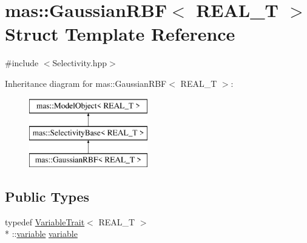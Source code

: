 \hypertarget{structmas_1_1_gaussian_r_b_f}{\section{mas\-:\-:Gaussian\-R\-B\-F$<$ R\-E\-A\-L\-\_\-\-T $>$ Struct Template Reference}
\label{structmas_1_1_gaussian_r_b_f}
}


{\ttfamily \#include $<$Selectivity.\-hpp$>$}

Inheritance diagram for mas\-:\-:Gaussian\-R\-B\-F$<$ R\-E\-A\-L\-\_\-\-T $>$\-:\begin{figure}[H]
\begin{center}
\leavevmode
\includegraphics[height=3.000000cm]{structmas_1_1_gaussian_r_b_f}
\end{center}
\end{figure}
\subsection*{Public Types}
\begin{DoxyCompactItemize}
\item 
typedef \hyperlink{structmas_1_1_variable_trait}{Variable\-Trait}$<$ R\-E\-A\-L\-\_\-\-T $>$\\*
\-::\hyperlink{structmas_1_1_gaussian_r_b_f_a6aa7c2aa04e8a70a63c751cf240b37ab}{variable} \hyperlink{structmas_1_1_gaussian_r_b_f_a6aa7c2aa04e8a70a63c751cf240b37ab}{variable}
\end{DoxyCompactItemize}
